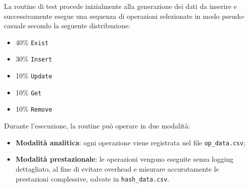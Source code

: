 La routine di test procede inizialmente alla generazione dei dati da inserire e successivamente esegue una sequenza di operazioni selezionate 
in modo pseudo-casuale secondo la seguente distribuzione:

\begin{itemize}
    \item 40\% \texttt{Exist}
    \item 30\% \texttt{Insert}
    \item 10\% \texttt{Update}
    \item 10\% \texttt{Get}
    \item 10\% \texttt{Remove}
\end{itemize}

Durante l'esecuzione, la routine può operare in due modalità:
\begin{itemize}
    \item \textbf{Modalità analitica}: ogni operazione viene registrata nel file \texttt{op\_data.csv};
    \item \textbf{Modalità prestazionale}: le operazioni vengono eseguite senza logging dettagliato, al fine di evitare overhead e 
    misurare accuratamente le prestazioni complessive, salvate in \texttt{hash\_data.csv}.
\end{itemize}

